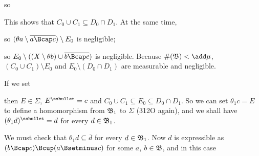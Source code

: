 {


\noindent so


\noindent This shows that $C_0\cup C_1\subseteq D_0\cap D_1$.   At the
same time,




\noindent so
$(\theta a\setminus\overline{a\Bcap c})\setminus E_0$ is negligible;


\noindent so $E_0\setminus((X\setminus\theta b)\cup\overline{b\Bcap c})$
is negligible.   Because $\#(\frak B)<\add\mu$,
$(C_0\cup C_1)\setminus E_0$ and $E_0\setminus(D_0\cap D_1)$ are
measurable and negligible.

If we set


\noindent then $E\in\Sigma$, $E^{\ssbullet}=c$ and
$C_0\cup C_1\subseteq E_0\subseteq D_0\cap D_1$.   So we can set
$\theta_1c=E$ to define a homomorphism from $\frak B_1$ to $\Sigma$
(312O again), and we shall have $(\theta_1d)^{\ssbullet}=d$ for every
$d\in\frak B_1$.

We must check that $\theta_1d\subseteq\overline{d}$ for every
$d\in\frak B_1$.   Now $d$ is expressible as
$(b\Bcap c)\Bcup(a\Bsetminus c)$ for some $a$, $b\in\frak B$, and in this
case


}
